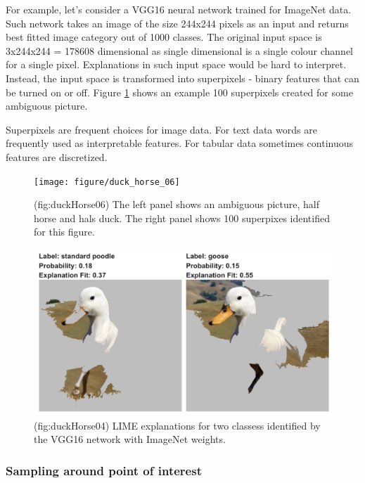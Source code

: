 \documentclass[12pt,]{krantz}
\theoremstyle{definition}
\theoremstyle{definition}
\theoremstyle{definition}
\theoremstyle{remark}
\begin{document}
For example, let's consider a VGG16 neural network trained for ImageNet
data. Such network takes an image of the size 244x244 pixels as an input
and returns best fitted image category out of 1000 classes. The original
input space is 3x244x244 = 178608 dimensional as single dimensional is a
single colour channel for a single pixel. Explanations in such input
space would be hard to interpret. Instead, the input space is
transformed into superpixels - binary features that can be turned on or
off. Figure \ref{fig:duckHorse06} shows an example 100 superpixels
created for some ambiguous picture.

Superpixels are frequent choices for image data. For text data words are
frequently used as interpretable features. For tabular data sometimes
continuous features are discretized.

\begin{figure}

{\centering \texttt{[image: figure/duck\_horse\_06]} 

}

\caption{(fig:duckHorse06) The left panel shows an ambiguous picture, half horse and hals duck. The right panel shows 100 superpixes identified for this figure.}\label{fig:duckHorse06}
\end{figure}

\begin{figure}

{\centering \includegraphics[width=1\linewidth]{figure/duck_horse_04} 

}

\caption{(fig:duckHorse04) LIME explanations for two classess identified by the VGG16 network with ImageNet weights.}\label{fig:duckHorse04}
\end{figure}

\hypertarget{sampling-around-point-of-interest}{%
\subsubsection{Sampling around point of
interest}\label{sampling-around-point-of-interest}}
\end{document}
